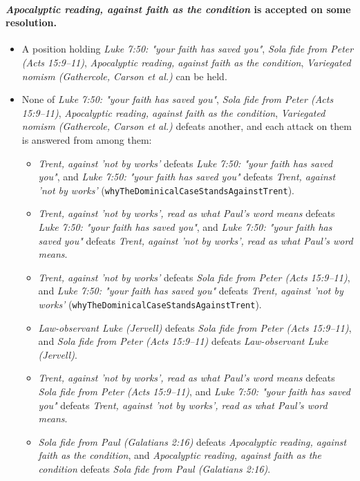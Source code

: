 \documentclass[11pt]{article}
\begin{document}
\paragraph{\emph{Apocalyptic reading, against faith as the condition} is accepted on some resolution.}
\begin{itemize}
\item A position holding \emph{Luke 7:50: "your faith has saved you"}, \emph{Sola fide from Peter (Acts 15:9–11)}, \emph{Apocalyptic reading, against faith as the condition}, \emph{Variegated nomism (Gathercole, Carson et al.)} can be held.
\item None of \emph{Luke 7:50: "your faith has saved you"}, \emph{Sola fide from Peter (Acts 15:9–11)}, \emph{Apocalyptic reading, against faith as the condition}, \emph{Variegated nomism (Gathercole, Carson et al.)} defeats another, and each attack on them is answered from among them:
\begin{itemize}
\item \emph{Trent, against 'not by works'} defeats \emph{Luke 7:50: "your faith has saved you"}, and \emph{Luke 7:50: "your faith has saved you"} defeats \emph{Trent, against 'not by works'} (\texttt{why\allowbreak{}The\allowbreak{}Dominical\allowbreak{}Case\allowbreak{}Stands\allowbreak{}Against\allowbreak{}Trent}).
\item \emph{Trent, against 'not by works', read as what Paul's word means} defeats \emph{Luke 7:50: "your faith has saved you"}, and \emph{Luke 7:50: "your faith has saved you"} defeats \emph{Trent, against 'not by works', read as what Paul's word means}.
\item \emph{Trent, against 'not by works'} defeats \emph{Sola fide from Peter (Acts 15:9–11)}, and \emph{Luke 7:50: "your faith has saved you"} defeats \emph{Trent, against 'not by works'} (\texttt{why\allowbreak{}The\allowbreak{}Dominical\allowbreak{}Case\allowbreak{}Stands\allowbreak{}Against\allowbreak{}Trent}).
\item \emph{Law-observant Luke (Jervell)} defeats \emph{Sola fide from Peter (Acts 15:9–11)}, and \emph{Sola fide from Peter (Acts 15:9–11)} defeats \emph{Law-observant Luke (Jervell)}.
\item \emph{Trent, against 'not by works', read as what Paul's word means} defeats \emph{Sola fide from Peter (Acts 15:9–11)}, and \emph{Luke 7:50: "your faith has saved you"} defeats \emph{Trent, against 'not by works', read as what Paul's word means}.
\item \emph{Sola fide from Paul (Galatians 2:16)} defeats \emph{Apocalyptic reading, against faith as the condition}, and \emph{Apocalyptic reading, against faith as the condition} defeats \emph{Sola fide from Paul (Galatians 2:16)}.

\end{itemize}
\end{itemize}
\end{document}
